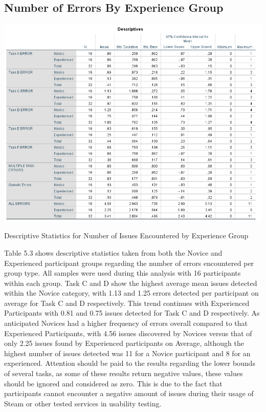 \subsection{Number of Errors By Experience Group}
\begin{table}[H]
\includegraphics[width=\linewidth]{Screenshots/ErrorRecords/errorBreakdownDescriptives.png}
\label{DescriptivesErrorsPerGroup}
\caption{Descriptive Statistics for Number of Issues Encountered by Experience Group}
\end{table}

Table 5.3 shows descriptive statistics taken from both the Novice and Experienced participant groups regarding the number of errors encountered per group type. All samples were used during this analysis with 16 participants within each group. Task C and D show the highest average mean issues detected within the Novice category, with 1.13 and 1.25 errors detected per participant on average for Task C and D respectively. This trend continues with Experienced Participants with 0.81 and 0.75 issues detected for Task C and D respectively. As anticipated Novices had a higher frequency of errors overall compared to that Experienced Participants, with 4.56 issues discovered by Novices versus that of only 2.25 issues found by Experienced participants on Average, although the highest number of issues detected was 11 for a Novice participant and 8 for an experienced. Attention should be paid to the results regarding the lower bounds of several tasks, as some of these results return negative values, these values should be ignored and considered as zero. This is due to the fact that participants cannot encounter a negative amount of issues during their usage of Steam or other tested services in usability testing.

